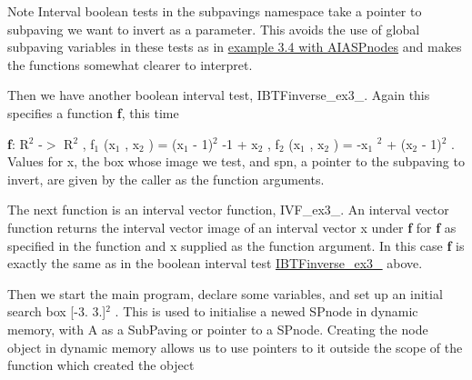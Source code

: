 \begin{DoxyCodeInclude}

\end{DoxyCodeInclude}


\begin{DoxyNote}{\-Note}
\-Interval boolean tests in the subpavings namespace take a pointer to subpaving we want to invert as a parameter. \-This avoids the use of global subpaving variables in these tests as in \hyperlink{AIASubPavings_AIAglobal}{example 3.4 with \-A\-I\-A\-S\-Pnodes} and makes the functions somewhat clearer to interpret.
\end{DoxyNote}
\-Then we have another boolean interval test, \label{newsubpavings_NewIBTFinverse_ex3_4}%
\hypertarget{newsubpavings_NewIBTFinverse_ex3_4}{}%
\-I\-B\-T\-Finverse\-\_\-ex3\-\_. \-Again this specifies a function {\bfseries f}, this time

{\bfseries f}\-: \-R$^{\mbox{2}}$  -\/$>$ \-R$^{\mbox{2}}$ , f$_{\mbox{1}}$ (x$_{\mbox{1}}$ , x$_{\mbox{2}}$ ) = (x$_{\mbox{1}}$  -\/ 1)$^{\mbox{2}}$  -\/1 + x$_{\mbox{2}}$ , f$_{\mbox{2}}$ (x$_{\mbox{1}}$ , x$_{\mbox{2}}$ ) = -\/x$_{\mbox{1}}$ $^{\mbox{2}}$  + (x$_{\mbox{2}}$  -\/ 1)$^{\mbox{2}}$ . \-Values for x, the box whose image we test, and spn, a pointer to the subpaving to invert, are given by the caller as the function arguments.


\begin{DoxyCodeInclude}

\end{DoxyCodeInclude}


\-The next function is an interval vector function, \label{newsubpavings_NewIVF_ex3_4}%
\hypertarget{newsubpavings_NewIVF_ex3_4}{}%
\-I\-V\-F\-\_\-ex3\-\_. \-An interval vector function returns the interval vector image of an interval vector x under {\bfseries f} for {\bfseries f} as specified in the function and x supplied as the function argument. \-In this case {\bfseries f} is exactly the same as in the boolean interval test \hyperlink{newsubpavings_NewIBTFinverse_ex3_4}{\-I\-B\-T\-Finverse\-\_\-ex3\-\_} above.


\begin{DoxyCodeInclude}

\end{DoxyCodeInclude}


\-Then we start the main program, declare some variables, and set up an initial search box \mbox{[}-\/3. 3.\mbox{]}$^{\mbox{2}}$ . \-This is used to initialise a newed \-S\-Pnode in dynamic memory, with \-A as a \-Sub\-Paving or pointer to a \-S\-Pnode. \-Creating the node object in dynamic memory allows us to use pointers to it outside the scope of the function which created the object


